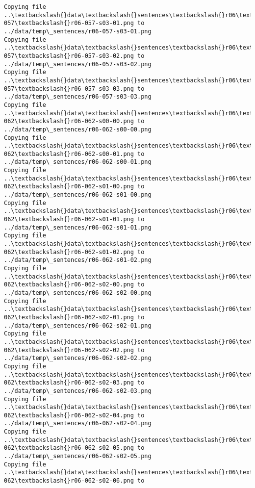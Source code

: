 \documentclass[11pt]{article}
\begin{document}
\begin{Verbatim}[commandchars=\\\{\}]
Copying file ..\textbackslash{}data\textbackslash{}sentences\textbackslash{}r06\textbackslash{}r06-057\textbackslash{}r06-057-s03-01.png to
../data/temp\_sentences/r06-057-s03-01.png
Copying file ..\textbackslash{}data\textbackslash{}sentences\textbackslash{}r06\textbackslash{}r06-057\textbackslash{}r06-057-s03-02.png to
../data/temp\_sentences/r06-057-s03-02.png
Copying file ..\textbackslash{}data\textbackslash{}sentences\textbackslash{}r06\textbackslash{}r06-057\textbackslash{}r06-057-s03-03.png to
../data/temp\_sentences/r06-057-s03-03.png
Copying file ..\textbackslash{}data\textbackslash{}sentences\textbackslash{}r06\textbackslash{}r06-062\textbackslash{}r06-062-s00-00.png to
../data/temp\_sentences/r06-062-s00-00.png
Copying file ..\textbackslash{}data\textbackslash{}sentences\textbackslash{}r06\textbackslash{}r06-062\textbackslash{}r06-062-s00-01.png to
../data/temp\_sentences/r06-062-s00-01.png
Copying file ..\textbackslash{}data\textbackslash{}sentences\textbackslash{}r06\textbackslash{}r06-062\textbackslash{}r06-062-s01-00.png to
../data/temp\_sentences/r06-062-s01-00.png
Copying file ..\textbackslash{}data\textbackslash{}sentences\textbackslash{}r06\textbackslash{}r06-062\textbackslash{}r06-062-s01-01.png to
../data/temp\_sentences/r06-062-s01-01.png
Copying file ..\textbackslash{}data\textbackslash{}sentences\textbackslash{}r06\textbackslash{}r06-062\textbackslash{}r06-062-s01-02.png to
../data/temp\_sentences/r06-062-s01-02.png
Copying file ..\textbackslash{}data\textbackslash{}sentences\textbackslash{}r06\textbackslash{}r06-062\textbackslash{}r06-062-s02-00.png to
../data/temp\_sentences/r06-062-s02-00.png
Copying file ..\textbackslash{}data\textbackslash{}sentences\textbackslash{}r06\textbackslash{}r06-062\textbackslash{}r06-062-s02-01.png to
../data/temp\_sentences/r06-062-s02-01.png
Copying file ..\textbackslash{}data\textbackslash{}sentences\textbackslash{}r06\textbackslash{}r06-062\textbackslash{}r06-062-s02-02.png to
../data/temp\_sentences/r06-062-s02-02.png
Copying file ..\textbackslash{}data\textbackslash{}sentences\textbackslash{}r06\textbackslash{}r06-062\textbackslash{}r06-062-s02-03.png to
../data/temp\_sentences/r06-062-s02-03.png
Copying file ..\textbackslash{}data\textbackslash{}sentences\textbackslash{}r06\textbackslash{}r06-062\textbackslash{}r06-062-s02-04.png to
../data/temp\_sentences/r06-062-s02-04.png
Copying file ..\textbackslash{}data\textbackslash{}sentences\textbackslash{}r06\textbackslash{}r06-062\textbackslash{}r06-062-s02-05.png to
../data/temp\_sentences/r06-062-s02-05.png
Copying file ..\textbackslash{}data\textbackslash{}sentences\textbackslash{}r06\textbackslash{}r06-062\textbackslash{}r06-062-s02-06.png to

\end{Verbatim}
\end{document}
